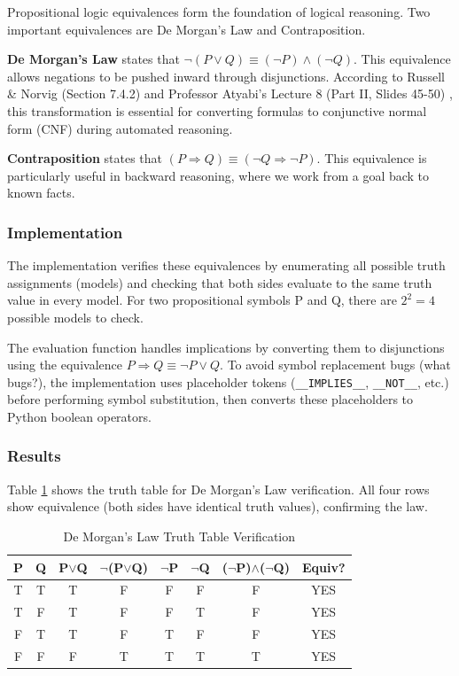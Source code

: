 \documentclass[letterpaper]{article}
\begin{document}
Propositional logic equivalences form the foundation of logical reasoning. Two important equivalences are De Morgan's Law and Contraposition.

\textbf{De Morgan's Law} states that $\neg(P \vee Q) \equiv (\neg P) \wedge (\neg Q)$. This equivalence allows negations to be pushed inward through disjunctions. According to Russell \& Norvig (Section 7.4.2) and Professor Atyabi's Lecture 8 (Part II, Slides 45-50) \cite{atyabi2025lecture8}, this transformation is essential for converting formulas to conjunctive normal form (CNF) during automated reasoning.

\textbf{Contraposition} states that $(P \Rightarrow Q) \equiv (\neg Q \Rightarrow \neg P)$. This equivalence is particularly useful in backward reasoning, where we work from a goal back to known facts.

\subsubsection{Implementation}

The implementation verifies these equivalences by enumerating all possible truth assignments (models) and checking that both sides evaluate to the same truth value in every model. For two propositional symbols P and Q, there are $2^2 = 4$ possible models to check.

The evaluation function handles implications by converting them to disjunctions using the equivalence $P \Rightarrow Q \equiv \neg P \vee Q$. To avoid symbol replacement bugs (what bugs?), the implementation uses placeholder tokens (\texttt{\_\_IMPLIES\_\_}, \texttt{\_\_NOT\_\_}, etc.) before performing symbol substitution, then converts these placeholders to Python boolean operators.

\subsubsection{Results}

Table \ref{tab:demorgan} shows the truth table for De Morgan's Law verification. All four rows show equivalence (both sides have identical truth values), confirming the law.

\begin{table}[h]
\centering
\caption{De Morgan's Law Truth Table Verification}
\label{tab:demorgan}
\begin{tabular}{cc|ccccc|c}
\toprule
P & Q & P$\vee$Q & $\neg$(P$\vee$Q) & $\neg$P & $\neg$Q & ($\neg$P)$\wedge$($\neg$Q) & Equiv? \\
\midrule
T & T & T & F & F & F & F & YES \\
T & F & T & F & F & T & F & YES \\
F & T & T & F & T & F & F & YES \\
F & F & F & T & T & T & T & YES \\
\bottomrule
\end{tabular}
\end{table}
\end{document}

